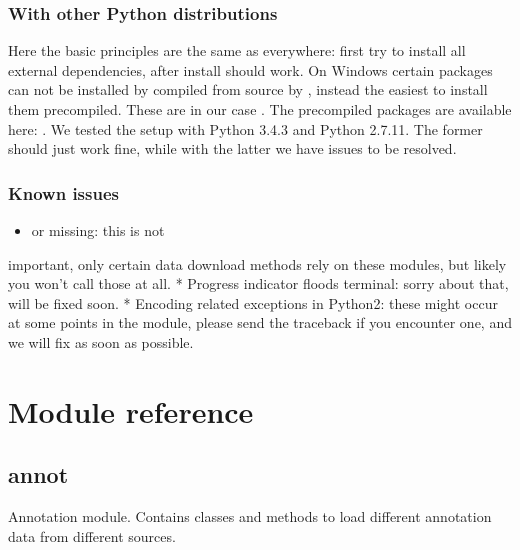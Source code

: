 \documentclass[letterpaper,10pt,english]{sphinxmanual}
\begin{document}
\subsection{With other Python distributions}
\label{\detokenize{installation:with-other-python-distributions}}
Here the basic principles are the same as everywhere: first try to install all
external dependencies, after  install should work. On Windows certain
packages can not be installed by compiled from source by , instead the
easiest to install them precompiled. These are in our case . The
precompiled packages are available here:
. We tested the setup with Python
3.4.3 and Python 2.7.11. The former should just work fine, while with the
latter we have issues to be resolved.


\subsection{Known issues}
\label{\detokenize{installation:known-issues}}\begin{itemize}
\item {} 
 \textendash{} or  missing: this is not

\end{itemize}

important, only certain data download methods rely on these modules, but
likely you won’t call those at all.
* Progress indicator floods terminal: sorry about that, will be fixed soon.
* Encoding related exceptions in Python2: these might occur at some points in
the module, please send the traceback if you encounter one, and we will fix
as soon as possible.



\chapter{Module reference}
\label{\detokenize{reference:module-reference}}\label{\detokenize{reference::doc}}

\section{annot}
\label{\detokenize{reference:module-pypath.annot}}\label{\detokenize{reference:annot}}
Annotation module. Contains classes and methods to load different
annotation data from different sources.
\end{document}
